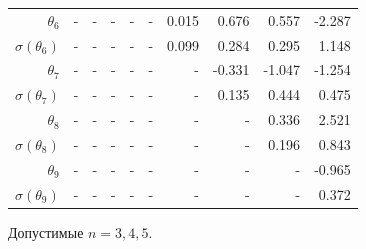 \documentclass{matmex-diploma-custom}
\begin{document}
\begin{table}[h!!]
\begin{tabular}{r|rr|rrr|rrrr}
 $\theta_6$&-      &    - &    - &    - &    - &   0.015 &    0.676 &    0.557 &   -2.287 \\
 $\sigma(\theta_6)$&-    &    - &    - &    - &    - &   0.099 &    0.284 &    0.295 &    1.148 \\
 $\theta_7$&-     &    - &    - &    - &    - &    - &  -0.331 &   -1.047 &   -1.254 \\
 $ \sigma(\theta_7)$&-     &    - &    - &    - &    - &    - &     0.135 &    0.444 &    0.475 \\
 $\theta_8$&-     &    - &    - &    - &    - &    - &    - &   0.336 &    2.521 \\
 $ \sigma(\theta_8)$&-     &    - &    - &    - &    - &    - &    - &    0.196 &    0.843 \\
 $\theta_9$&-     &    - &    - &    - &    - &    - &    - &    - &  -0.965  \\
 $ \sigma(\theta_9)$&-     &    - &    - &    - &    - &    - &    - &    - &   0.372  \\
\end{tabular}
\end{table}

Допустимые $n = 3, 4, 5$.
\pagebreak
%
%
%
%
\pagebreak
\end{document}
